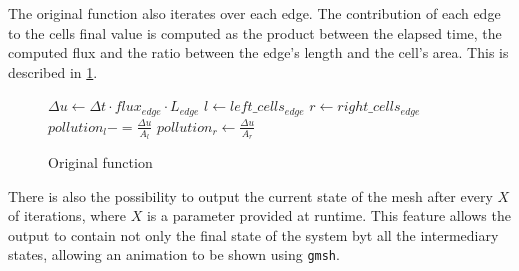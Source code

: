 The original \update function also iterates over each edge. The contribution of each edge to the cells final value is computed as the product between the elapsed time, the computed flux and the ratio between the edge's length and the cell's area. This is described in \cref{alg:update}.

\begin{figure}[!htp]
	\begin{alg}
			\State $\Delta{u} \gets \Delta{t} \cdot flux_{edge} \cdot L_{edge}$
			\State $l \gets left\_cells_{edge}$
			\State $r \gets right\_cells_{edge}$
			\State $pollution_{l} -= \frac{\Delta{u}}{A_{l}}$
				\State $pollution_{r} \gets \frac{\Delta{u}}{A_{r}}$
			\EndIf
		\EndFor
	\end{alg}

	\caption{Original \update function}
	\label{alg:update}
\end{figure}



There is also the possibility to output the current state of the mesh after every $X$ of iterations, where $X$ is a parameter provided at runtime. This feature allows the output to contain not only the final state of the system byt all the intermediary states, allowing  an animation to be shown using \texttt{gmsh}.


